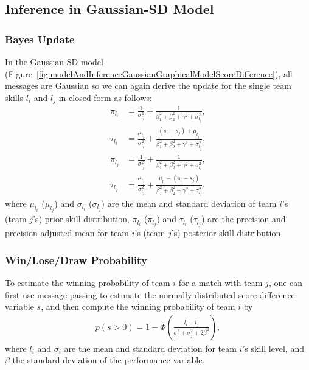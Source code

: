 \subsection{Inference in Gaussian-SD Model}

\subsubsection{Bayes Update} 
In the Gaussian-SD model
(Figure~\ref{fig:modelAndInferenceGaussianGraphicalModelScoreDifference}),
all messages are Gaussian so we can again derive the update
for the single team skills $l_i$ and $l_j$ in closed-form
as follows:
\begin{align}
  \pi_{l_{i}}  &=  \frac{1}{\sigma_{l_{i}}^2} + \frac{1}{\beta_1^2+\beta_2^2+\gamma^2+\sigma_{l_{j}}^2},  \nonumber \\
  \tau_{l_{i}} &=    \frac{\mu_{l_{i}}}{\sigma_{l_{i}}^2} + \frac{(s_i-s_j)+\mu_{l_{j}}}{\beta_1^2+\beta_2^2+\gamma^2+\sigma_{l_{j}}^2}, \nonumber    \\
  \pi_{l_{j}}  &=    \frac{1}{\sigma_{l_{j}}^2} + \frac{1}{\beta_1^2+\beta_2^2+\gamma^2+\sigma_{l_{i}}^2}, \nonumber \\
  \tau_{l_{j}} &=    \frac{\mu_{l_{j}}}{\sigma_{l_{j}}^2} + \frac{\mu_{l_{i}}-(s_i-s_j)}{\beta_1^2+\beta_2^2+\gamma^2+\sigma_{l_{i}}^2},
 \end{align}
where $\mu_{l_i}$ ($\mu_{l_j}$) and $\sigma_{l_i}$
      ($\sigma_{l_j}$) are the mean and standard deviation of team
      $i$'s (team $j$'s) prior skill distribution,
$\pi_{l_{i}}$ ($\pi_{l_{j}}$) and $\tau_{l_{i}}$
      ($\tau_{l_{j}}$) are the precision and precision adjusted mean
      for team $i$'s (team $j$'s) posterior skill distribution.

\subsubsection{Win/Lose/Draw Probability} 
To estimate the winning probability of team $i$ for a match with team $j$, one can first use message passing to estimate the normally distributed score difference variable $s$, and then compute the winning probability of team $i$ by
\begin{align}
  p(s>0) = 1 -
  \Phi\left(\frac{l_i-l_j}{\sigma_i^2+\sigma_j^2+2 \beta^2}\right),
\end{align}
where $l_i$ and $\sigma_i$ are the mean and standard deviation for
team $i$'s skill level, and $\beta$ the standard deviation of the
performance variable.

